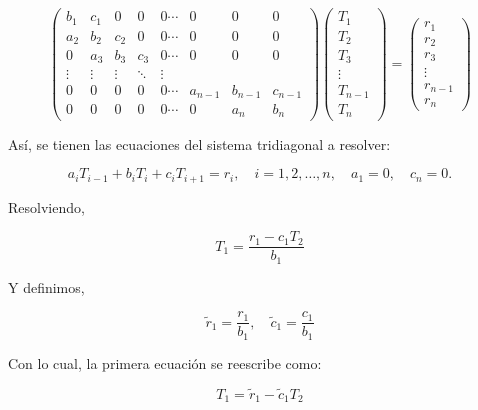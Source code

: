 \documentclass[11pt,a4paper]{article}
\begin{document}
\begin{equation}
\begin{pmatrix}
b_1 & c_1 & 0 & 0 & 0  \cdots & 0 & 0 & 0 \\
a_2 & b_2 & c_2 & 0 & 0  \cdots & 0 & 0 & 0 \\
0 & a_3 & b_3 & c_3 & 0  \cdots & 0 & 0 & 0 \\
\vdots & \vdots & \vdots & \ddots & \vdots \\
0 & 0 & 0 & 0 & 0  \cdots & a_{n-1} & b_{n-1} & c_{n-1} \\
0 & 0 & 0 & 0 & 0  \cdots & 0 & a_n & b_n
\end{pmatrix}
\begin{pmatrix}T_1 \\
T_2 \\
T_3 \\
\vdots \\
T_{n-1} \\
T_n
\end{pmatrix}
=
\begin{pmatrix}r_1 \\
r_2 \\
r_3 \\
\vdots \\
r_{n-1} \\
r_n
\end{pmatrix}
\end{equation}

As\'i, se tienen las ecuaciones del sistema tridiagonal a resolver:

\begin{equation}
a_i T_{i-1}+b_iT_i+c_iT_{i+1}=r_i,
\quad i=1,2,\ldots,n, \quad a_1=0, \quad c_n=0.
\end{equation}

Resolviendo,

\begin{equation}
T_1 = \frac{r_1 - c_1 T_2}{b_1}
\end{equation}

Y definimos,

\begin{equation}
\tilde{r}_1 = \frac{r_1}{b_1}, \quad \tilde{c}_1 = \frac{c_1}{b_1}
\label{eq:tri_factor_init1}
\end{equation}

Con lo cual, la primera ecuaci\'on se reescribe como:

\begin{equation}
T_1 = \tilde{r}_1 - \tilde{c}_1 T_2
\end{equation}
\end{document}
